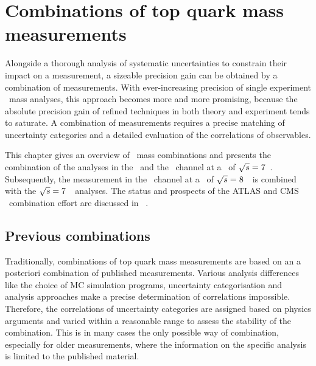 \chapter{Combinations of top quark mass measurements}
\label{chap:combinations}
%
Alongside a thorough analysis of systematic uncertainties to constrain their impact on a measurement, a sizeable precision gain can be obtained by a combination of measurements. With ever-increasing precision of single experiment \tquark\ mass analyses, this approach becomes more and more promising, because the absolute precision gain of refined techniques in both theory and experiment tends to saturate. 
%
A combination of measurements requires a precise matching of uncertainty categories and a detailed evaluation of the correlations of observables. 

This chapter gives an overview of \tquark\ mass combinations and presents the combination of the analyses in the \ttbarll\ and the \ttbarlj\ channel at a \cme\ of ${\sqrt{s}}=7$~\TeV. 
%
Subsequently, the measurement in the \ttbarll\ channel at a \cme\ of ${\sqrt{s}}=8$~\TeV\ is combined with the ${\sqrt{s}}=7$~\TeV\ analyses.
%
The status and prospects of the \gls{ATLAS} and \gls{CMS} \mt\ combination effort are discussed in ~\cite{Top2015combinissues}.



















\section{Previous combinations}
\label{sect:prevcomb}
%
Traditionally, combinations of top quark mass measurements are based on an a posteriori combination of published measurements. 
%
Various analysis differences like the choice of \gls{MC} simulation programs, uncertainty categorisation and analysis approaches make a precise determination of correlations impossible.
%
Therefore, the correlations of uncertainty categories are assigned based on physics arguments and varied within a reasonable range to assess the stability of the combination. This is in many cases the only possible way of combination, especially for older measurements, where the information on the specific analysis is limited to the published material.

